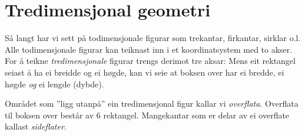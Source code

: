 \newpage
{}


\section{Tredimensjonal geometri}
Så langt har vi sett på todimensjonale figurar som trekantar, firkantar, sirklar o.l. Alle todimensjonale figurar kan teiknast inn i et koordinatsystem med to akser.
For å teikne \textit{tredimensjonale} figurar trengs derimot tre aksar:
Mens eit rektangel seiast å ha ei breidde og ei høgde, kan vi seie at boksen over har ei bredde, ei høgde \textsl{og} ei lengde (dybde). \vsk

Området som ''ligg utanpå'' ein tredimensjonal figur kallar vi \textit{overflata}. Overflata til boksen over består av 6 rektangel. Mangekantar som er delar av ei overflate kallast \textit{sideflater}.

